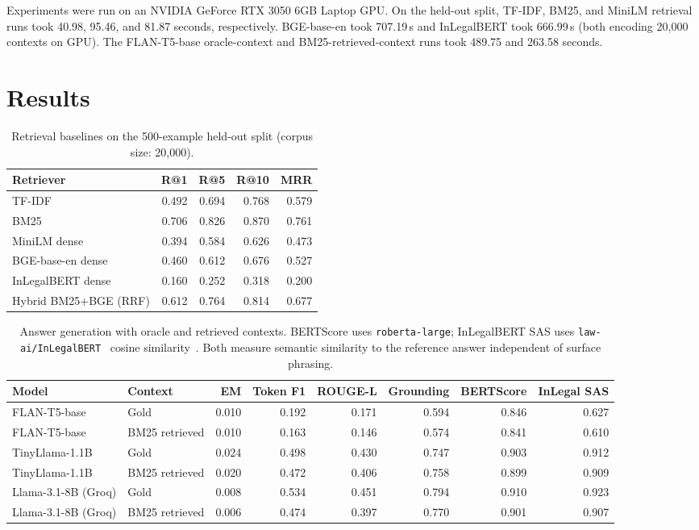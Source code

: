 \documentclass{article}
\begin{document}
Experiments were run on an NVIDIA GeForce RTX 3050 6GB Laptop GPU. On the held-out split, TF-IDF, BM25, and MiniLM retrieval runs took 40.98, 95.46, and 81.87 seconds, respectively. BGE-base-en took 707.19\,s and InLegalBERT took 666.99\,s (both encoding 20,000 contexts on GPU). The FLAN-T5-base oracle-context and BM25-retrieved-context runs took 489.75 and 263.58 seconds.

\section{Results}

\begin{table}[h]
\centering
\caption{Retrieval baselines on the 500-example held-out split (corpus size: 20,000).}
\label{tab:retrieval}
\begin{tabular}{lrrrr}
\toprule
Retriever & R@1 & R@5 & R@10 & MRR \\
\midrule
TF-IDF & 0.492 & 0.694 & 0.768 & 0.579 \\
BM25 & 0.706 & 0.826 & 0.870 & 0.761 \\
MiniLM dense & 0.394 & 0.584 & 0.626 & 0.473 \\
BGE-base-en dense & 0.460 & 0.612 & 0.676 & 0.527 \\
InLegalBERT dense & 0.160 & 0.252 & 0.318 & 0.200 \\
Hybrid BM25+BGE (RRF) & 0.612 & 0.764 & 0.814 & 0.677 \\
\bottomrule
\end{tabular}
\end{table}

\begin{table}[h]
\centering
\caption{Answer generation with oracle and retrieved contexts. BERTScore uses \texttt{roberta-large}; InLegalBERT SAS uses \texttt{law-ai/InLegalBERT}~\citep{paul2023pretraining} cosine similarity~\citep{risch2021sas}. Both measure semantic similarity to the reference answer independent of surface phrasing.}
\label{tab:generation}
\begin{tabular}{llrrrrrr}
\toprule
Model & Context & EM & Token F1 & ROUGE-L & Grounding & BERTScore & InLegal SAS \\
\midrule
FLAN-T5-base & Gold & 0.010 & 0.192 & 0.171 & 0.594 & 0.846 & 0.627 \\
FLAN-T5-base & BM25 retrieved & 0.010 & 0.163 & 0.146 & 0.574 & 0.841 & 0.610 \\
TinyLlama-1.1B & Gold & 0.024 & 0.498 & 0.430 & 0.747 & 0.903 & 0.912 \\
TinyLlama-1.1B & BM25 retrieved & 0.020 & 0.472 & 0.406 & 0.758 & 0.899 & 0.909 \\
Llama-3.1-8B (Groq) & Gold & 0.008 & 0.534 & 0.451 & 0.794 & 0.910 & 0.923 \\
Llama-3.1-8B (Groq) & BM25 retrieved & 0.006 & 0.474 & 0.397 & 0.770 & 0.901 & 0.907 \\
\bottomrule
\end{tabular}
\end{table}
\end{document}
